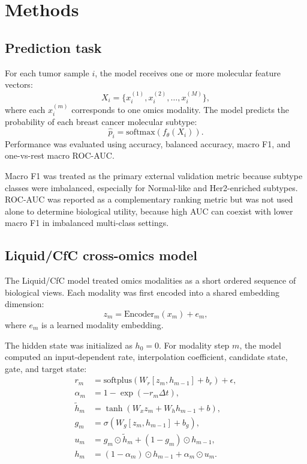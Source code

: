 \section{Methods}

\subsection{Prediction task}

For each tumor sample \(i\), the model receives one or more molecular feature vectors:
\[
X_i = \{x_i^{(1)}, x_i^{(2)}, \ldots, x_i^{(M)}\},
\]
where each \(x_i^{(m)}\) corresponds to one omics modality. The model predicts the probability of each breast cancer molecular subtype:
\[
\hat{p}_i = \mathrm{softmax}(f_\theta(X_i)).
\]
Performance was evaluated using accuracy, balanced accuracy, macro F1, and one-vs-rest macro ROC-AUC.

Macro F1 was treated as the primary external validation metric because subtype classes were imbalanced, especially for Normal-like and Her2-enriched subtypes. ROC-AUC was reported as a complementary ranking metric but was not used alone to determine biological utility, because high AUC can coexist with lower macro F1 in imbalanced multi-class settings.

\subsection{Liquid/CfC cross-omics model}

The Liquid/CfC model treated omics modalities as a short ordered sequence of biological views. Each modality was first encoded into a shared embedding dimension:
\[
z_m = \mathrm{Encoder}_m(x_m) + e_m,
\]
where \(e_m\) is a learned modality embedding.

The hidden state was initialized as \(h_0=0\). For modality step \(m\), the model computed an input-dependent rate, interpolation coefficient, candidate state, gate, and target state:
\begin{align}
r_m &= \mathrm{softplus}\left(W_r[z_m, h_{m-1}] + b_r\right) + \epsilon, \\
\alpha_m &= 1 - \exp(-r_m \Delta t), \\
\tilde{h}_m &= \tanh(W_x z_m + W_h h_{m-1} + b), \\
g_m &= \sigma\left(W_g[z_m, h_{m-1}] + b_g\right), \\
u_m &= g_m \odot \tilde{h}_m + (1-g_m)\odot h_{m-1}, \\
h_m &= (1-\alpha_m)\odot h_{m-1} + \alpha_m \odot u_m.
\end{align}

